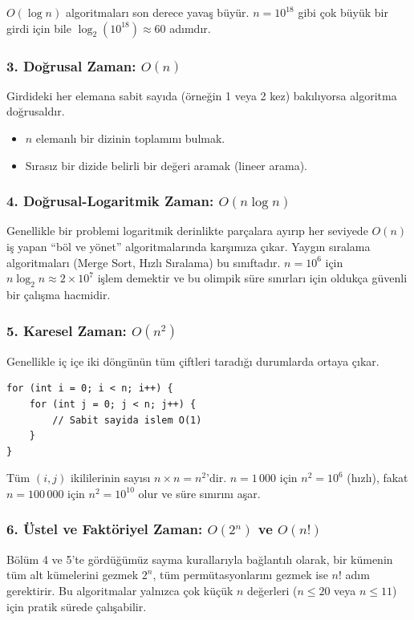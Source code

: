 $O(\log n)$ algoritmaları son derece yavaş büyür. $n = 10^{18}$ gibi çok büyük bir girdi için bile $\log_2(10^{18}) \approx 60$ adımdır.

\subsubsection{3. Doğrusal Zaman: $O(n)$}
Girdideki her elemana sabit sayıda (örneğin 1 veya 2 kez) bakılıyorsa algoritma doğrusaldır.
\begin{itemize}
    \item $n$ elemanlı bir dizinin toplamını bulmak.
    \item Sırasız bir dizide belirli bir değeri aramak (lineer arama).
\end{itemize}

\subsubsection{4. Doğrusal-Logaritmik Zaman: $O(n \log n)$}
Genellikle bir problemi logaritmik derinlikte parçalara ayırıp her seviyede $O(n)$ iş yapan ``böl ve yönet'' algoritmalarında karşımıza çıkar. Yaygın sıralama algoritmaları (Merge Sort, Hızlı Sıralama) bu sınıftadır. $n = 10^6$ için $n \log_2 n \approx 2 \times 10^7$ işlem demektir ve bu olimpik süre sınırları için oldukça güvenli bir çalışma hacmidir.

\subsubsection{5. Karesel Zaman: $O(n^2)$}
Genellikle iç içe iki döngünün tüm çiftleri taradığı durumlarda ortaya çıkar.
\begin{lstlisting}[language=CTemel]
for (int i = 0; i < n; i++) {
    for (int j = 0; j < n; j++) {
        // Sabit sayida islem O(1)
    }
}
\end{lstlisting}
Tüm $(i, j)$ ikililerinin sayısı $n \times n = n^2$'dir. $n = 1\,000$ için $n^2 = 10^6$ (hızlı), fakat $n = 100\,000$ için $n^2 = 10^{10}$ olur ve süre sınırını aşar.

\subsubsection{6. Üstel ve Faktöriyel Zaman: $O(2^n)$ ve $O(n!)$}
Bölüm 4 ve 5'te gördüğümüz sayma kurallarıyla bağlantılı olarak, bir kümenin tüm alt kümelerini gezmek $2^n$, tüm permütasyonlarını gezmek ise $n!$ adım gerektirir. Bu algoritmalar yalnızca çok küçük $n$ değerleri ($n \le 20$ veya $n \le 11$) için pratik sürede çalışabilir.

